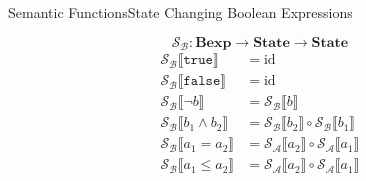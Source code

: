 \documentclass{beamer}
\newcommand{\Bexp}{\textbf{Bexp}}
\newcommand{\State}{\textbf{State}}
\newcommand{\true}{\texttt{true}}
\newcommand{\false}{\texttt{false}}
\newcommand{\sem}[2]{\mathcal{#1} \llbracket #2 \rrbracket}
\begin{document}
\begin{frame}{Semantic Functions}{State Changing Boolean Expressions}

    $$\mathcal{S_B} : \Bexp \to \State \to \State$$
    \begin{align*}
        \sem{S_B}{\true}          & = \mathrm{id}                         \\
        \sem{S_B}{\false}         & = \mathrm{id}                         \\
        \sem{S_B}{\neg b}         & = \sem{S_B}{b}                        \\
        \sem{S_B}{b_1 \wedge b_2} & = \sem{S_B}{b_2} \circ \sem{S_B}{b_1} \\
        \sem{S_B}{a_1 = a_2}      & = \sem{S_A}{a_2} \circ \sem{S_A}{a_1} \\
        \sem{S_B}{a_1 \leq a_2}   & = \sem{S_A}{a_2} \circ \sem{S_A}{a_1}
    \end{align*}

\end{frame}
\end{document}
